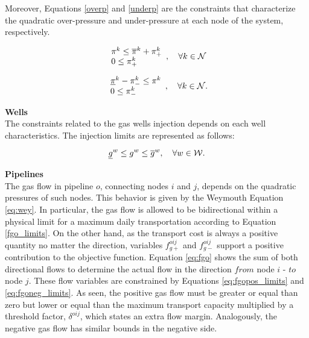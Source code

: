 Moreover, Equations \ref{overp} and \ref{underp} are the constraints that characterize the quadratic over-pressure and under-pressure at each node of the system, respectively. 

\begin{equation}
\begin{array}{l}
 \pi^{k} \le \overline{\pi}^{k} + \pi^{k}_{+}\\
 0 \le \pi^{k}_{+}\\
\end{array} 
,\quad \forall k  \in {\cal{N}}\\ 
\label{overp}
\end{equation}

\begin{equation}
\begin{array}{l}
\underline{\pi}^{k} - \pi^{k}_{-} \le \pi^{k}\\
0 \le \pi^{k}_{-}\\
\end{array} 
,\quad \forall k  \in {\cal{N}}.\\ 
\label{underp}
\vspace{0.3cm}
\end{equation}

\noindent \textbf{Wells}\\

The constraints related to the gas wells injection depends on each well characteristics. The injection limits are represented as follows:

\begin{equation}
\underline{g}^{w} \le g^{w} \le \overline{g}^{w}, \quad \forall w \in \cal{W}.
\label{eq:g_limits}
\end{equation}

\noindent \textbf{Pipelines} \\

The gas flow in pipeline $o$, connecting nodes $i$ and $j$, depends on the quadratic pressures of such nodes. This behavior is given by the Weymouth Equation \ref{eq:wey}. In particular, the gas flow is allowed to be bidirectional within a physical limit for a maximum daily transportation according to Equation \ref{fgo_limits}. On the other hand, as the transport cost is always a positive quantity no matter the direction, variables $f^{oij}_{g+}$ and $f^{oij}_{g-}$ support a positive contribution to the objective function. Equation \ref{eq:fgo} shows the sum of both directional flows to determine the actual flow in the direction $from$  node $i$ - $to$ node $j$. These flow variables are constrained by Equations \ref{eq:fgopos_limits} and \ref{eq:fgoneg_limits}. As seen, the positive gas flow must be greater or equal than zero but lower or equal than the maximum transport capacity multiplied by a threshold factor, $\delta^{oij}$, which states an extra flow margin. Analogously, the negative gas flow has similar bounds in the negative side.


